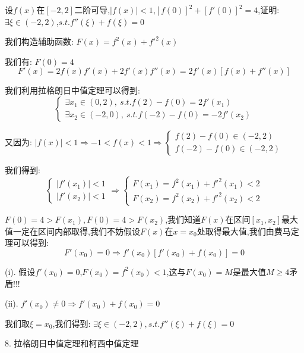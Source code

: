 \begin{proposition}
	设$f(x)$在$[-2,2]$二阶可导,$|f(x)|<1$,$[f(0)]^2+[f'(0)]^2=4$,证明: $\exists \xi\in(-2,2)$,$s.t. f''(\xi)+f(\xi)=0$
\end{proposition}
\begin{solution}

	我们构造辅助函数: $F(x)=f^{2}(x)+f'^{2}(x)$

	我们有: $F(0)=4$
	$$F'(x)=2f(x)f'(x)+2f'(x)f''(x)=2f'(x)[f(x)+f''(x)]$$

	我们利用拉格朗日中值定理可以得到:
	$$\left\lbrace
		\begin{array}{l}
			\exists x_{1}\in(0,2),\ s.t. f(2)-f(0)=2f'(x_{1}) \\
			\exists x_{2}\in(-2,0),\ s.t. f(-2)-f(0)=-2f'(x_{2})
		\end{array}
		\right. $$

	又因为: $|f(x)|<1\Rightarrow -1<f(x)<1\Rightarrow \left\lbrace
		\begin{array}{l}
			f(2)-f(0)\in(-2,2) \\
			f(-2)-f(0)\in(-2,2)
		\end{array}
		\right. $

	我们得到:
	$$\left\lbrace
		\begin{array}{l}
			|f'(x_{1})|<1 \\
			|f'(x_{2})|<1
		\end{array}
		\right. \Rightarrow \left\lbrace
		\begin{array}{l}
			F(x_{1})=f^{2}(x_{1})+f'^{2}(x_{1})<2 \\
			F(x_{2})=f^{2}(x_{2})+f'^{2}(x_{2})<2
		\end{array}
		\right. $$

	$F(0)=4>F(x_{1}),F(0)=4>F(x_{2})$,我们知道$F(x)$在区间$[x_{1},x_{2}]$最大值一定在区间内部取得,我们不妨假设$F(x)$在$x=x_{0}$处取得最大值,我们由费马定理可以得到:
	$$F'(x_{0})=0\Rightarrow f'(x_{0})[f'(x_{0})+f(x_{0})]=0$$

	(i). 假设$f'(x_{0})=0$,$F(x_{0})=f^{2}(x_{0})<1$,这与$F(x_{0})=M$是最大值$M\geq 4$矛盾!!!

	(ii). $f'(x_{0})\neq 0\Rightarrow f'(x_{0})+f(x_{0})=0$

	我们取$\xi=x_{0}$,我们得到: $\exists \xi\in(-2,2),s.t. f''(\xi)+f(\xi)=0$

\end{solution}


8. 拉格朗日中值定理和柯西中值定理

